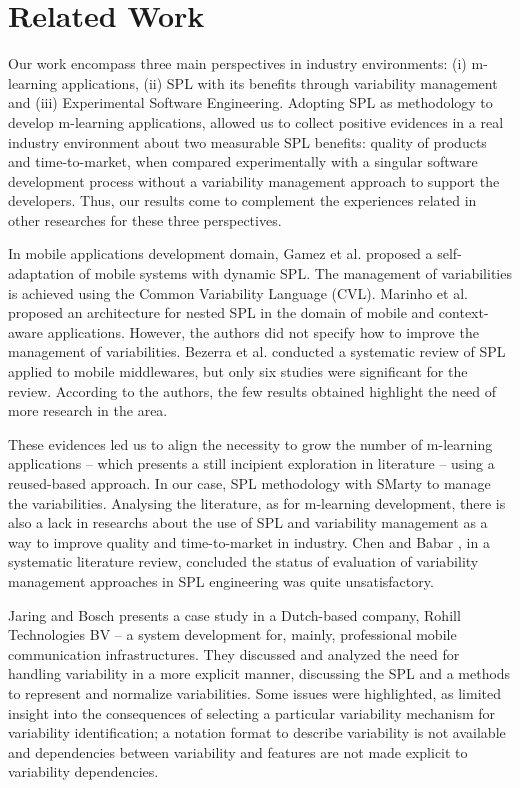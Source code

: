 \section{Related Work} \label{section6}

Our work encompass three main perspectives in industry environments: (i) m-learning applications, (ii) SPL with its benefits through variability management and (iii) Experimental Software Engineering. Adopting SPL as methodology to develop m-learning applications, allowed us to collect positive evidences in a real industry environment about two measurable SPL benefits: quality of products and time-to-market, when compared experimentally with a singular software development process without a variability management approach to support the developers. Thus, our results come to complement the experiences related in other researches for these three perspectives.

In mobile applications development domain, Gamez et al. \cite{gamez14} proposed a self-adaptation of mobile systems with dynamic SPL. The management of variabilities is achieved using the Common Variability Language (CVL). Marinho et al. \cite{marinho10} proposed an architecture for nested SPL in the domain of mobile and context-aware applications. However, the authors did not specify how to improve the management of variabilities. Bezerra et al. \cite{bezerra09} conducted a systematic review of SPL applied to mobile middlewares, but only six studies were significant for the review. According to the authors, the few results obtained highlight the need of more research in the area. 

These evidences led us to align the necessity to grow the number of m-learning applications -- which presents a still incipient exploration in literature -- using a reused-based approach. In our case, SPL methodology with SMarty to manage the variabilities. Analysing the literature, as for m-learning development, there is also a lack in researchs about the use of SPL and variability management as a way to improve quality and time-to-market in industry. Chen and Babar \cite{chen11}, in a systematic literature review, concluded the status of evaluation of variability management approaches in SPL engineering was quite unsatisfactory. 

Jaring and Bosch \cite{jaring02} presents a case study in a Dutch-based company, Rohill Technologies BV -- a system development for, mainly, professional mobile communication infrastructures. They discussed and analyzed the need for handling variability in a more explicit manner, discussing the SPL and a methods to represent and normalize variabilities. Some issues were highlighted, as limited insight into the consequences of selecting a particular variability mechanism for variability identification; a notation format to describe variability is not available and dependencies between variability and features are not made explicit to variability dependencies.

